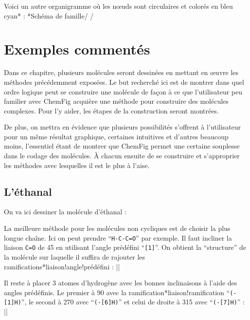 \documentclass[10pt]{article}
\makeatletter
\newcommand\idx{\@ifstar{\let\print@or@not\@gobble\idx@}{\let\print@or@not\@firstofone\idx@}}
\newcommand\idx@[1]{%
	\ifcat\expandafter\noexpand\@car#1\@nil\relax%
		\expandafter\ifx\@car#1\@nil\protect
			\index{#1}%
			\print@or@not{#1}%
		\else
			\saveexpandmode\expandarg
			\StrSubstitute{\string#1}{\string @}{\@empty\protect\symbol{'100}}[\temp@]%
			\StrGobbleLeft\temp@1[\temp@]%
			\restoreexpandmode
			\expandafter\index\expandafter{\temp@ @\protect\texttt{\protect\textbackslash\temp@}}%
			\print@or@not{\texttt{\string#1}}%
		\fi
	\else
		\index{#1}%
		\print@or@not{#1}%
	\fi
}
\newcommand\make@car@active[2]{%
	\catcode`#1\active
	\begingroup
		\lccode`\~`#1\relax
		\lowercase{\endgroup\def~{#2}}%
}
\newif\if@exstar
\newcommand\exemple{%
	\begingroup
	\parskip\z@
	\@makeother\;\@makeother\!\@makeother\?\@makeother\:%
	\@ifstar{\@exstartrue\exemple@}{\@exstarfalse\exemple@}}
\newcommand\exemple@[2][65]{%
	\medbreak\noindent
	\begingroup
		\let\do\@makeother\dospecials
		\make@car@active\ { {}}%
		\make@car@active\^^M{\par\leavevmode}%
		\make@car@active\,{\leavevmode\kern\z@\string,}%
		\make@car@active\-{\leavevmode\kern\z@\string-}%
		\make@car@active\>{\leavevmode\kern\z@\string>}%
		\make@car@active\<{\leavevmode\kern\z@\string<}%
		\exemple@@{#1}{#2}%
}
\newcommand\exemple@@[3]{%
	\def\@tempa##1#3{\exemple@@@{#1}{#2}{##1}}%
	\@tempa
}
\newcommand\exemple@@@[3]{%
	\xdef\the@code{#3}%
	\endgroup
	\if@exstar
		\begingroup
			\fboxrule0.4pt
			\let\breakboxparindent\z@
			\def\bkvz@bottom{\hrule\@height\fboxrule}%
			\let\bkvz@before@breakbox\relax
			\def\bkvz@set@linewidth{\advance\linewidth\dimexpr-2\fboxrule-2\fboxsep}%
			\def\bkvz@left{\vrule\@width\fboxrule\hskip\fboxsep}%
			\def\bkvz@right{\hskip\fboxsep\vrule\@width\fboxrule}%
			\def\bkvz@top{\hbox to \hsize{%
				\vrule\@width\fboxrule\@height\fboxrule
				\leaders\bkvz@bottom\hfill
				\ECFAugie
				\fboxsep\z@
				\colorbox{black}{\kern0.25em\color{white}\footnotesize\lower0.5ex\hbox{\strut#2}\kern0.25em}%
				\leaders\bkvz@bottom\hfill
				\vrule\@width\fboxrule\@height\fboxrule}}%
			\breakbox
				\kern.5ex\relax
				\ttfamily\footnotesize\the@code\par
				\normalfont
				\kern3pt
				\hrule height0.1pt width\linewidth depth0.1pt
				\vskip5pt
				\rightskip0pt plus 1fill
				\everypar{{\color{lightgray}\rlap{\vrule height0.1pt width\linewidth depth0.1pt}}\hskip0pt plus 1fill}%
				\newlinechar`\^^M\everyeof{\noexpand}\scantokens{#3}\par
			\endbreakbox
		\endgroup
	\else
		\vskip0.5ex
		\boxput*(0,1)
			{\fboxsep\z@
			\hbox{\ECFAugie\colorbox{black}{\leavevmode\kern0.25em{\color{white}\footnotesize\strut#2}\kern0.25em}}%
			}%
			{\fboxsep5pt
			\fbox{%
				$\vcenter{\hsize\dimexpr0.#1\linewidth-\fboxsep-\fboxrule\relax
					\kern5pt\parskip0pt \ttfamily\footnotesize\the@code}%
				\vcenter{\kern5pt\hsize\dimexpr\linewidth-0.#1\linewidth-\fboxsep-\fboxrule\relax
					\everypar{{\color{lightgray}\rlap{\vrule height0.1pt width\dimexpr\linewidth-0.#1\linewidth-\fboxsep-\fboxrule depth0.1pt}}}%
					\footnotesize\newlinechar`\^^M\everyeof{\noexpand}\scantokens{#3}}$%
				}%
			}%
	\fi
	\medbreak
	\endgroup
}
\let\do\@makeother\dospecials
\newcommand\CF{{\ECFAugie ChemFig}\xspace}
\makeatother
\begin{document}
Voici un autre organigramme où les nœuds sont circulaires et colorés en bleu cyan\idx*{\printatom} :
\exemple*{Schéma de famille}/
\setbondoffset{0pt}
\setatomsep{80pt}
\renewcommand\printatom[1]{\textsf{#1}}
/

\section{Exemples commentés}\label{exemples.commentes}
Dans ce chapitre, plusieurs molécules seront dessinées en mettant en œuvre les méthodes précédemment exposées. Le but recherché ici est de montrer dans quel ordre logique peut se construire une molécule de façon à ce que l'utilisateur peu familier avec \CF acquière une méthode pour construire des molécules complexes. Pour l'y aider, les étapes de la construction seront montrées.

De plus, on mettra en évidence que plusieurs possibilités s'offrent à l'utilisateur pour un même résultat graphique, certaines intuitives et d'autres beaucoup moins, l'essentiel étant de montrer que \CF permet une certaine souplesse dans le codage des molécules. À chacun ensuite de se construire et s'approprier les méthodes avec lesquelles il est le plus à l'aise.

\subsection{L'éthanal}
On va ici dessiner la molécule d'éthanal : 

La meilleure méthode pour les molécules non cycliques est de choisir la plus longue chaîne. Ici on peut prendre ``\verb|H-C-C=O|'' par exemple. Il faut incliner la liaison \verb|C=O| de 45\degres{} en utilisant l'angle prédéfini ``\verb-[1]-''. On obtient la ``structure'' de la molécule sur laquelle il suffira de rajouter les ramifications\idx*{liaison!angle!prédéfini} :
\exemple{Structure de l'éthanal}||

Il reste à placer 3 atomes d'hydrogène avec les bonnes inclinaisons à l'aide des angles prédéfinis. Le premier à 90\degres{} avec la ramification\idx*{liaison!ramification} ``\verb/(-[1]H)/'', le second à 270\degres{} avec ``\verb/(-[6]H)/'' et celui de droite à 315\degres{} avec ``\verb/(-[7]H)/'' :
\exemple{Ethanal}||
\end{document}
